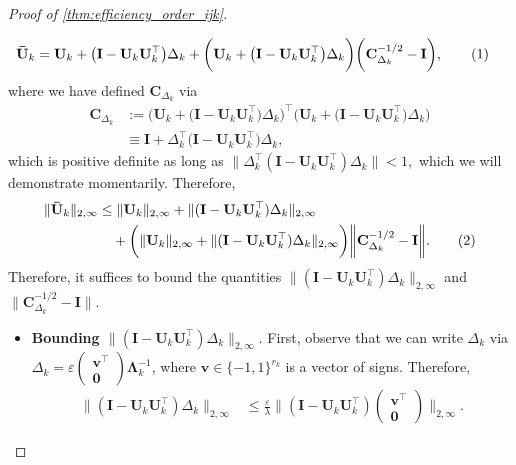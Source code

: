 \documentclass[10pt]{article}
\newcommand{\0}{{\mathbf{0}}}
\newcommand{\1}{{\mathbf{1}}}
\newcommand{\I}{{\mathbf{I}}}
\newcommand{\U}{{\mathbf{U}}}
\renewcommand{\t}{^{\top}}
\newcommand{\eps}{\varepsilon}
\newcommand{\inv}{^{-1}}
\newcommand\numberthis{\addtocounter{equation}{1}\tag{\theequation}}
\begin{document}
\begin{proof}[Proof of \cref{thm:efficiency_order_ijk}]
\begin{itemize}
    \begin{align*}
        \mathbf{\bar U}_k &= \U_k + \big( \I - \U_k \U_k\t\big) \Delta_k + \bigg( \U_k + \big( \I - \U_k \U_k\t\big) \Delta_k \bigg) \bigg( \mathbf{C}_{\Delta_k}^{-1/2} - \mathbf{I} \bigg), \numberthis \label{ukbarexpression}
    \end{align*}
    where we have defined $\mathbf{C}_{\Delta_k}$ via
    \begin{align*}
        \mathbf{C}_{\Delta_k} &:= \bigg( \U_k + \big( \I - \U_k \U_k\t \big) \Delta_k \bigg)\t \bigg( \U_k + \big( \I - \U_k \U_k\t \big) \Delta_k \bigg)\\
        &\equiv \mathbf{I} + \Delta_k\t  \big( \I - \U_k \U_k\t \big) \Delta_k,
    \end{align*}
    which is positive definite as long as $\|\Delta_k\t (\I - \U_k \U_k\t) \Delta_k\| < 1,$ which we will demonstrate momentarily.      Therefore,
    \begin{align*}
        \| \mathbf{\bar U}_k \|_{2,\infty} &\leq \| \U_k \|_{2,\infty} + \| (\I - \U_k \U_k\t) \Delta_k \|_{2,\infty} \\
        &\quad + \bigg( \| \U_k \|_{2,\infty} + \| (\I - \U_k \U_k\t) \Delta_k \|_{2,\infty} \bigg) \bigg\| \mathbf{C}_{\Delta_k}^{-1/2} - \mathbf{I} \bigg\|. \numberthis \label{incoherence}
    \end{align*}
    Therefore, it suffices to bound the quantities $\|(\I - \U_k\U_k\t)\Delta_k \|_{2,\infty}$ and $\|\mathbf{C}_{\Delta_k}^{-1/2} - \I \|$. 
    \begin{itemize}
        \item \textbf{Bounding $\|(\I - \U_k\U_k\t)\Delta_k \|_{2,\infty}$}.  First, observe that we can write $\Delta_k$ via $\Delta_k = \eps \begin{pmatrix} \mathbf{v}\t \\ \mathbf{0} \end{pmatrix} \mathbf{\Lambda}_k\inv$, where $\mathbf{v} \in \{-1,1\}^{r_k}$ is a vector of signs.  Therefore,
        \begin{align*}
            \| (\mathbf{I} - \U_k \U_k\t) \Delta_k \|_{2,\infty} &\leq \frac{\eps}{\lambda} \| (\mathbf{I} - \U_k \U_k\t)\begin{pmatrix} \mathbf{v}\t \\ \mathbf{0} \end{pmatrix} \|_{2,\infty}.
        \end{align*}

\end{itemize}
\end{itemize}
\end{proof}
\end{document}
